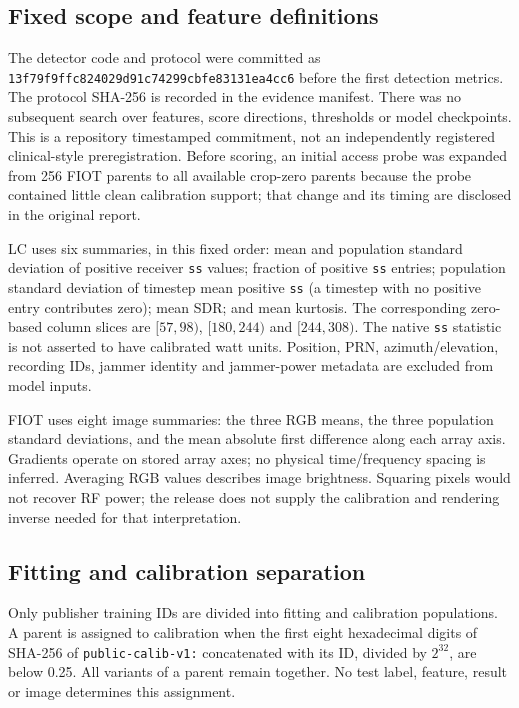 \documentclass[
  10pt,
]{article}
\begin{document}
\subsection{Fixed scope and feature
definitions}\label{fixed-scope-and-feature-definitions}

The detector code and protocol were committed as
\texttt{13f79f9ffc824029d91c74299cbfe83131ea4cc6} before the first
detection metrics. The protocol SHA-256 is recorded in the evidence
manifest. There was no subsequent search over features, score
directions, thresholds or model checkpoints. This is a repository
timestamped commitment, not an independently registered clinical-style
preregistration. Before scoring, an initial access probe was expanded
from 256 FIOT parents to all available crop-zero parents because the
probe contained little clean calibration support; that change and its
timing are disclosed in the original report.

LC uses six summaries, in this fixed order: mean and population standard
deviation of positive receiver \texttt{ss} values; fraction of positive
\texttt{ss} entries; population standard deviation of timestep mean
positive \texttt{ss} (a timestep with no positive entry contributes
zero); mean SDR; and mean kurtosis. The corresponding zero-based column
slices are \([57,98)\), \([180,244)\) and \([244,308)\). The native
\texttt{ss} statistic is not asserted to have calibrated watt units.
Position, PRN, azimuth/elevation, recording IDs, jammer identity and
jammer-power metadata are excluded from model inputs.

FIOT uses eight image summaries: the three RGB means, the three
population standard deviations, and the mean absolute first difference
along each array axis. Gradients operate on stored array axes; no
physical time/frequency spacing is inferred. Averaging RGB values
describes image brightness. Squaring pixels would not recover RF power;
the release does not supply the calibration and rendering inverse needed
for that interpretation.

\subsection{Fitting and calibration
separation}\label{fitting-and-calibration-separation}

Only publisher training IDs are divided into fitting and calibration
populations. A parent is assigned to calibration when the first eight
hexadecimal digits of SHA-256 of \texttt{public-calib-v1:} concatenated
with its ID, divided by \(2^{32}\), are below 0.25. All variants of a
parent remain together. No test label, feature, result or image
determines this assignment.
\end{document}
